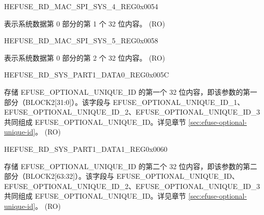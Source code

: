 \begin{register}{H}{EFUSE\_RD\_MAC\_SPI\_SYS\_4\_REG}{0x0054}\label{regdesc:EFUSERDMACSPISYS4REG}
%
\regnewline%
\begin{regdesc}\begin{reglist}
\label{fielddesc:EFUSESYSDATAPART01}\item [EFUSE\_SYS\_DATA\_PART0\_1] 表示系统数据第 0 部分的第 1 个 32 位内容。 (RO)
\end{reglist}\end{regdesc}
\end{register}


\begin{register}{H}{EFUSE\_RD\_MAC\_SPI\_SYS\_5\_REG}{0x0058}\label{regdesc:EFUSERDMACSPISYS5REG}
%
\regnewline%
\begin{regdesc}\begin{reglist}
\label{fielddesc:EFUSESYSDATAPART02}\item [EFUSE\_SYS\_DATA\_PART0\_2] 表示系统数据第 0 部分的第 2 个 32 位内容。 (RO)
\end{reglist}\end{regdesc}
\end{register}


\begin{register}{H}{EFUSE\_RD\_SYS\_PART1\_DATA0\_REG}{0x005C}\label{regdesc:EFUSERDSYSPART1DATA0REG}
%
\regnewline%
\begin{regdesc}\begin{reglist}
\label{fielddesc:EFUSEOPTIONALUNIQUEID}\item [EFUSE\_OPTIONAL\_UNIQUE\_ID] 存储 EFUSE\_OPTIONAL\_UNIQUE\_ID 的第一个 32 位内容，即该参数的第一部分（BLOCK2[31:0]）。该字段与 EFUSE\_OPTIONAL\_UNIQUE\_ID\_1、EFUSE\_OPTIONAL\_UNIQUE\_ID\_2、EFUSE\_OPTIONAL\_UNIQUE\_ID\_3 共同组成 EFUSE\_OPTIONAL\_UNIQUE\_ID。详见章节 \ref{sec:efuse-optional-unique-id}。 (RO)
\end{reglist}\end{regdesc}
\end{register}


\begin{register}{H}{EFUSE\_RD\_SYS\_PART1\_DATA1\_REG}{0x0060}\label{regdesc:EFUSERDSYSPART1DATA1REG}
%
\regnewline%
\begin{regdesc}\begin{reglist}
\label{fielddesc:EFUSEOPTIONALUNIQUEID1}\item [EFUSE\_OPTIONAL\_UNIQUE\_ID\_1] 存储 EFUSE\_OPTIONAL\_UNIQUE\_ID 的第二个 32 位内容，即该参数的第二部分（BLOCK2[63:32]）。该字段与 EFUSE\_OPTIONAL\_UNIQUE\_ID、EFUSE\_OPTIONAL\_UNIQUE\_ID\_2、EFUSE\_OPTIONAL\_UNIQUE\_ID\_3 共同组成 EFUSE\_OPTIONAL\_UNIQUE\_ID。详见章节 \ref{sec:efuse-optional-unique-id}。 (RO)
\end{reglist}\end{regdesc}
\end{register}


